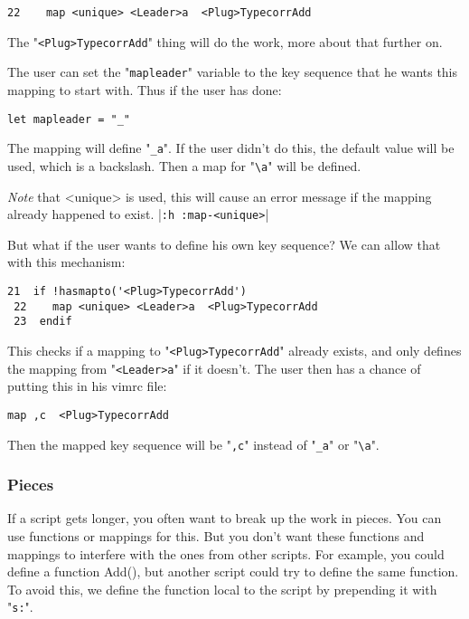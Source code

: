 \begin{Verbatim}[samepage=true]
 22    map <unique> <Leader>a  <Plug>TypecorrAdd
\end{Verbatim}

The "\texttt{<Plug>TypecorrAdd}" thing will do the work, more about that further on.

The user can set the "\texttt{mapleader}" variable to the key sequence that he wants this mapping to start with.
Thus if the user has done:

\begin{Verbatim}[samepage=true]
 let mapleader = "_"
\end{Verbatim}

The mapping will define "\texttt{\_a}".
If the user didn't do this, the default value will be used, which is a backslash.
Then a map for "\texttt{\textbackslash{}a}" will be defined.

\emph{Note} that <unique> is used, this will cause an error message if the mapping already happened to exist. |\texttt{:h :map-<unique>}|

But what if the user wants to define his own key sequence?
We can allow that with this mechanism:

\begin{Verbatim}[samepage=true]
 21  if !hasmapto('<Plug>TypecorrAdd')
 22    map <unique> <Leader>a  <Plug>TypecorrAdd
 23  endif
\end{Verbatim}

This checks if a mapping to "\texttt{<Plug>TypecorrAdd}" already exists, and only defines the mapping from "\texttt{<Leader>a}" if it doesn't.
The user then has a chance of putting this in his vimrc file:

\begin{Verbatim}[samepage=true]
 map ,c  <Plug>TypecorrAdd
\end{Verbatim}

Then the mapped key sequence will be "\texttt{,c}" instead of "\texttt{\_a}" or "\texttt{\textbackslash{}a}".
\subsubsection{Pieces}
If a script gets longer, you often want to break up the work in pieces.
You can use functions or mappings for this.
But you don't want these functions and mappings to interfere with the ones from other scripts.
For example, you could define a function Add(), but another script could try to define the same function.
To avoid this, we define the function local to the script by prepending it with "\texttt{s:}".

